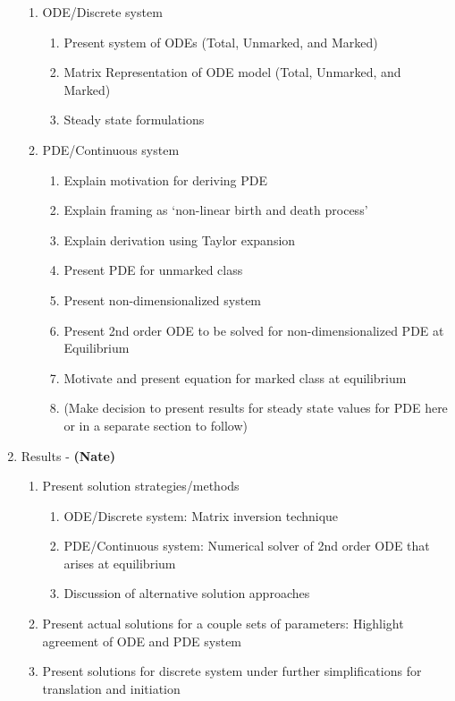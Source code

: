 \documentclass[review]{elsarticle}
\begin{document}
\begin{enumerate}
\begin{enumerate}
\item ODE/Discrete system
\begin{enumerate}
\item Present system of ODEs (Total, Unmarked, and Marked)
\item Matrix Representation of ODE model (Total, Unmarked, and Marked)
\item Steady state formulations
\end{enumerate}
\item PDE/Continuous system 
\begin{enumerate}
\item Explain motivation for deriving PDE
\item Explain framing as `non-linear birth and death process'
\item Explain derivation using Taylor expansion
\item Present PDE for unmarked class
\item Present non-dimensionalized system
\item Present 2nd order ODE to be solved for non-dimensionalized PDE at Equilibrium
\item Motivate and present equation for marked class at equilibrium
\item (Make decision to present results for steady state values for PDE here or in a separate section to follow)
\end{enumerate}
\end{enumerate}
\item Results  - \textbf{(Nate)}
\begin{enumerate}
\item Present solution strategies/methods
\begin{enumerate}
\item ODE/Discrete system: Matrix inversion technique
\item PDE/Continuous system: Numerical solver of 2nd order ODE that arises at equilibrium
\item Discussion of alternative solution approaches
\end{enumerate}
\item Present actual solutions for a couple sets of parameters: Highlight agreement of ODE and PDE system
\item Present solutions for discrete system under further simplifications for translation and initiation

\end{enumerate}
\end{enumerate}
\end{document}

